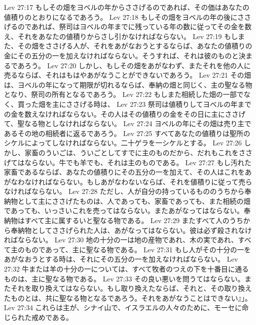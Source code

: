 Lev 27:17  もしその畑をヨベルの年からささげるのであれば、その価はあなたの値積りのとおりになるであろう。
Lev 27:18  もしその畑をヨベルの年の後にささげるのであれば、祭司はヨベルの年までに残っている年の数に従ってその金を数え、それをあなたの値積りからさし引かなければならない。
Lev 27:19  もしまた、その畑をささげる人が、それをあがなおうとするならば、あなたの値積りの金にその五分の一を加えなければならない。そうすれば、それは彼のものと決まるであろう。
Lev 27:20  しかし、もしその畑をあがなわず、またそれを他の人に売るならば、それはもはやあがなうことができないであろう。
Lev 27:21  その畑は、ヨベルの年になって期限が切れるならば、奉納の畑と同じく、主の聖なる物となり、祭司の所有となるであろう。
Lev 27:22  もしまた相続した畑の一部でなく、買った畑を主にささげる時は、
Lev 27:23  祭司は値積りしてヨベルの年までの金を数えなければならない。その人はその値積りの金をその日に主にささげて、聖なる物としなければならない。
Lev 27:24  ヨベルの年にその畑は売り主であるその地の相続者に返るであろう。
Lev 27:25  すべてあなたの値積りは聖所のシケルによってしなければならない。二十ゲラを一シケルとする。
Lev 27:26  しかし、家畜のういごは、ういごとしてすでに主のものだから、だれもこれをささげてはならない。牛でも羊でも、それは主のものである。
Lev 27:27  もし汚れた家畜であるならば、あなたの値積りにその五分の一を加えて、その人はこれをあがなわなければならない。もしあがなわないならば、それを値積りに従って売らなければならない。
Lev 27:28  ただし、人が自分の持っているもののうちから奉納物として主にささげたものは、人であっても、家畜であっても、また相続の畑であっても、いっさいこれを売ってはならない。またあがなってはならない。奉納物はすべて主に属するいと聖なる物である。
Lev 27:29  またすべて人のうちから奉納物としてささげられた人は、あがなってはならない。彼は必ず殺されなければならない。
Lev 27:30  地の十分の一は地の産物であれ、木の実であれ、すべて主のものであって、主に聖なる物である。
Lev 27:31  もし人がその十分の一をあがなおうとする時は、それにその五分の一を加えなければならない。
Lev 27:32  牛または羊の十分の一については、すべて牧者のつえの下を十番目に通るものは、主に聖なる物である。
Lev 27:33  その良い悪いを問うてはならない。またそれを取り換えてはならない。もし取り換えたならば、それと、その取り換えたものとは、共に聖なる物となるであろう。それをあがなうことはできない』」。
Lev 27:34  これらは主が、シナイ山で、イスラエルの人々のために、モーセに命じられた戒めである。


